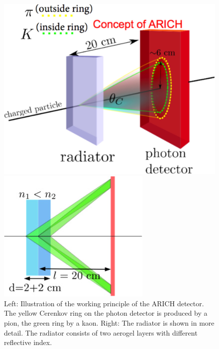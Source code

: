 \documentclass[a4paper,11pt,twosided,final,german,openbib,pdftex,listof=totoc,bibliography=totoc]{scrbook}
\begin{document}
\begin{figure}[h!]
	\centering
\begin{minipage}[b]{0.45\linewidth}
	\centering
	\includegraphics[width=\textwidth]{Bilder/ARICH}
\end{minipage}
\hspace{0.5cm}
\begin{minipage}[b]{0.45\linewidth}
	\centering
	\includegraphics[width=\textwidth]{Bilder/ARICH2}
\end{minipage}

	\caption[ARICH]{Left: Illustration of the working principle of the ARICH detector. The yellow Cerenkov ring on the photon detector is produced by a pion, the green ring by a kaon. Right: The radiator is shown in more detail. The radiator consists of two aerogel layers with different reflective index. \cite{TORASSA} }
\label{fig:ARICH}
\end{figure}
\end{document}
